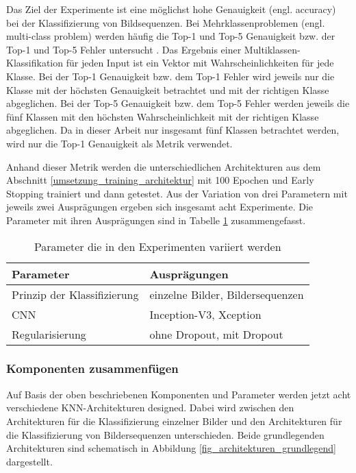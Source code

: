 Das Ziel der Experimente ist eine möglichst hohe Genauigkeit (engl. accuracy) bei der Klassifizierung von Bildsequenzen. Bei Mehrklassenproblemen (engl. multi-class problem) werden häufig die Top-1 und Top-5 Genauigkeit bzw. der Top-1 und Top-5 Fehler untersucht \cite{szegedy2016inception, simonyan2014vgg, chollet2017xception}. Das Ergebnis einer Multiklassen-Klassifikation für jeden Input ist ein Vektor mit Wahrscheinlichkeiten für jede Klasse. Bei der Top-1 Genauigkeit bzw. dem Top-1 Fehler wird jeweils nur die Klasse mit der höchsten Genauigkeit betrachtet und mit der richtigen Klasse abgeglichen. Bei der Top-5 Genauigkeit bzw. dem Top-5 Fehler werden jeweils die fünf Klassen mit den höchsten Wahrscheinlichkeit mit der richtigen Klasse abgeglichen. Da in dieser Arbeit nur insgesamt fünf Klassen betrachtet werden, wird nur die Top-1 Genauigkeit als Metrik verwendet.

Anhand dieser Metrik werden die unterschiedlichen Architekturen aus dem Abschnitt \ref{umsetzung_training_architektur} mit 100 Epochen und Early Stopping trainiert und dann getestet. Aus der Variation von drei Parametern mit jeweils zwei Ausprägungen ergeben sich insgesamt acht Experimente. Die Parameter mit ihren Ausprägungen sind in Tabelle \ref{tab_parameter} zusammengefasst.

\begin{table}[h]
\small
\centering
\def\arraystretch{1.4}
\begin{tabular}{l l}
\textbf{Parameter} & \textbf{Ausprägungen} \\
\hline
Prinzip der Klassifizierung & einzelne Bilder, Bildersequenzen \\
\acl{CNN} & Inception-V3, Xception \\
Regularisierung & ohne Dropout, mit Dropout \\
\hline
\end{tabular}
\caption{Parameter die in den Experimenten variiert werden}
\label{tab_parameter}
\end{table}


\subsubsection{Komponenten zusammenfügen}

Auf Basis der oben beschriebenen Komponenten und Parameter werden jetzt acht verschiedene \ac{KNN}-Architekturen designed. Dabei wird zwischen den Architekturen für die Klassifizierung einzelner Bilder und den Architekturen für die Klassifizierung von Bildersequenzen unterschieden. Beide grundlegenden Architekturen sind schematisch in Abbildung \ref{fig_architekturen_grundlegend} dargestellt.

